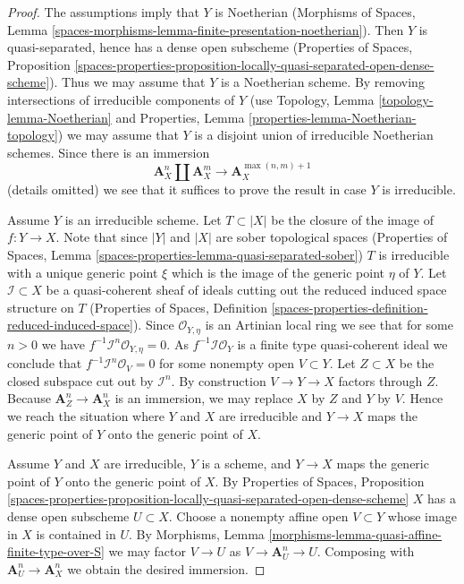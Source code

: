 \documentclass{stacks-project}
\theoremstyle{plain}
\theoremstyle{definition}
\theoremstyle{remark}
\numberwithin{equation}{subsection}
\begin{document}
\begin{proof}
The assumptions imply that $Y$ is Noetherian
(Morphisms of Spaces, Lemma
\ref{spaces-morphisms-lemma-finite-presentation-noetherian}).
Then $Y$ is quasi-separated, hence has a dense open subscheme
(Properties of Spaces, Proposition
\ref{spaces-properties-proposition-locally-quasi-separated-open-dense-scheme}).
Thus we may assume that $Y$ is a Noetherian scheme.
By removing intersections of irreducible components of $Y$
(use Topology, Lemma \ref{topology-lemma-Noetherian} and
Properties, Lemma \ref{properties-lemma-Noetherian-topology})
we may assume that $Y$ is a disjoint union of irreducible
Noetherian schemes. Since there is an immersion
$$
\mathbf{A}^n_X \amalg \mathbf{A}^m_X
\longrightarrow
\mathbf{A}^{\max(n, m) + 1}_X
$$
(details omitted) we see that it suffices to prove the result in case
$Y$ is irreducible.

\medskip\noindent
Assume $Y$ is an irreducible scheme. Let $T \subset |X|$ be the closure of the
image of $f : Y \to X$. Note that since $|Y|$ and $|X|$ are sober topological
spaces (Properties of Spaces, Lemma
\ref{spaces-properties-lemma-quasi-separated-sober})
$T$ is irreducible with a unique generic point $\xi$ which is the
image of the generic point $\eta$ of $Y$.
Let $\mathcal{I} \subset X$ be a quasi-coherent sheaf of ideals
cutting out the reduced induced space structure on $T$
(Properties of Spaces, Definition
\ref{spaces-properties-definition-reduced-induced-space}).
Since $\mathcal{O}_{Y, \eta}$ is an Artinian local ring we see
that for some $n > 0$ we have $f^{-1}\mathcal{I}^n \mathcal{O}_{Y, \eta} = 0$.
As $f^{-1}\mathcal{I}\mathcal{O}_Y$ is a finite type quasi-coherent ideal
we conclude that $f^{-1}\mathcal{I}^n\mathcal{O}_V = 0$ for
some nonempty open $V \subset Y$. Let $Z \subset X$ be the closed subspace
cut out by $\mathcal{I}^n$. By construction $V \to Y \to X$ factors through
$Z$. Because $\mathbf{A}^n_Z \to \mathbf{A}^n_X$ is an immersion,
we may replace $X$ by $Z$ and $Y$ by $V$.
Hence we reach the situation where $Y$ and $X$ are irreducible and
$Y \to X$ maps the generic point of $Y$ onto the generic point of $X$.

\medskip\noindent
Assume $Y$ and $X$ are irreducible, $Y$ is a scheme,
and $Y \to X$ maps the generic point of
$Y$ onto the generic point of $X$. By Properties of Spaces, Proposition
\ref{spaces-properties-proposition-locally-quasi-separated-open-dense-scheme}
$X$ has a dense open subscheme $U \subset X$. Choose a nonempty affine
open $V \subset Y$ whose image in $X$ is contained in $U$. By
Morphisms, Lemma \ref{morphisms-lemma-quasi-affine-finite-type-over-S}
we may factor $V \to U$ as $V \to \mathbf{A}^n_U \to U$. Composing
with $\mathbf{A}^n_U \to \mathbf{A}^n_X$ we obtain the desired immersion.
\end{proof}
\end{document}
